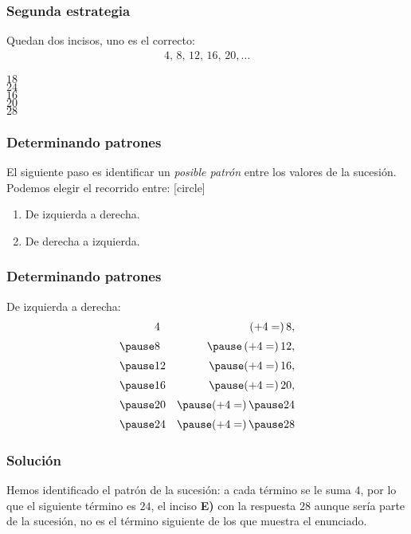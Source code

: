 \begin{frame}
\frametitle{Segunda estrategia}
Quedan dos incisos, uno es el correcto:
\begin{align*}
  4, \, 8, \, 12, \, 16, \, 20, \ldots
\end{align*}
\begin{choices}
\choice $18$ \\
\choice $24$ \\
\choice $16$ \\
\choice $20$ \\
\choice $28$ \\
\end{choices}
\pause
{}
\end{frame}
\begin{frame}
\frametitle{Determinando patrones}
El siguiente paso es identificar un \emph{posible patrón} entre los valores de la sucesión.
\\
\bigskip
\pause
Podemos elegir el recorrido entre:
\pause
{}
[circle]
\begin{enumerate}[<+->]
\item De izquierda a derecha.
\item De derecha a izquierda.
\end{enumerate}
\end{frame}
\begin{frame}
\frametitle{Determinando patrones}
De izquierda a derecha:
\begin{eqnarray*}
&4& \, (+ 4 = ) \, 8, \\[0.25em] \pause
&8& \pause \, (+ 4 =) \, 12, \\[0.25em] \pause
&12& \pause (+ 4 =) \, 16, \\[0.25em] \pause
&16& \pause (+ 4 = ) \, 20, \\[0.25em] \pause
&20& \pause (+ 4 = ) \, \pause 24 \\[0.25em] \pause
&24& \pause (+4 = ) \, \pause 28
\end{eqnarray*}
\end{frame}
\begin{frame}
\frametitle{Solución}
Hemos identificado el patrón de la sucesión: a cada término se le suma $4$, por lo que el siguiente término es $24$, el inciso \textbf{E)} con la respuesta $28$ aunque sería parte de la sucesión, no es el término siguiente de los que muestra el enunciado.
\end{frame}
